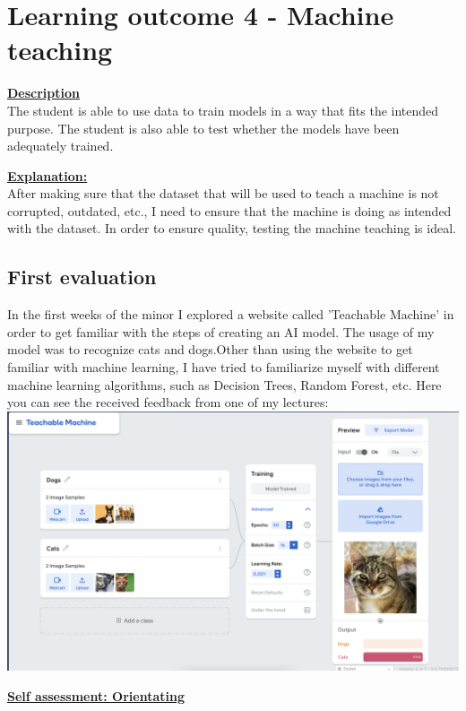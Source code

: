 \documentclass{article}
\begin{document}
	\section{Learning outcome 4 - Machine teaching}
	\underline{\textbf{Description}}\\
	The student is able to use data to train models in a way that fits the intended purpose.
	The student is also able to test whether the models have been adequately trained.
	
	\underline{\textbf{Explanation:}}\\
	After making sure that the dataset that will be used to teach a machine is not corrupted, outdated, etc., 
	I need to ensure that the machine is doing as intended with the dataset. In order to ensure quality, testing the
	machine teaching is ideal.
	
	\subsection{First evaluation}
	In the first weeks of the minor I explored a website called 'Teachable Machine' in order to get familiar with the steps of creating an 
	AI model. The usage of my model was to recognize cats and dogs.Other than using the website to get familiar with machine learning, 
  I have tried to familiarize myself with different machine learning algorithms, such as Decision Trees, Random Forest, etc. Here you can see the received feedback from one
  of my lectures:\\
  \includegraphics[width=\textwidth,keepaspectratio]{images/FeedbackTeachableMachines.png}

  \underline{\textbf{Self assessment: Orientating}}
\end{document}
